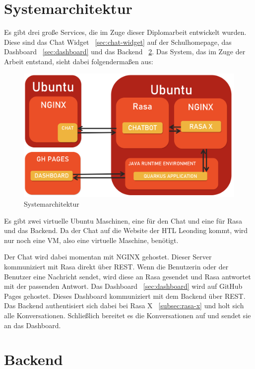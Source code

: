 \section{Systemarchitektur}\label{sec:systemarchitektur}

Es gibt drei große Services, die im Zuge dieser Diplomarbeit entwickelt wurden.
Diese sind das Chat Widget ~\ref{sec:chat-widget} auf der Schulhomepage, das Dashboard ~\ref{sec:dashboard} und das Backend ~\ref{sec:backend}.
Das System, das im Zuge der Arbeit entstand, sieht dabei folgendermaßen aus:

\begin{figure}[hbt!]
    \centering
    \includegraphics[scale=0.3]{pics/systemarchitektur}
    \caption{Systemarchitektur}
    \label{fig:impl:architektur}
\end{figure}

Es gibt zwei virtuelle Ubuntu Maschinen, eine für den Chat und eine für Rasa und das Backend.
Da der Chat auf die Website der HTL Leonding kommt, wird nur noch eine VM, also eine virtuelle Maschine, benötigt.

Der Chat wird dabei momentan mit NGINX gehostet.
Dieser Server kommuniziert mit Rasa direkt über REST.
Wenn die Benutzerin oder der Benutzer eine Nachricht sendet, wird diese an Rasa gesendet und Rasa antwortet mit der passenden Antwort.
Das Dashboard ~\ref{sec:dashboard} wird auf GitHub Pages gehostet.
Dieses Dashboard kommuniziert mit dem Backend über REST.
Das Backend authentisiert sich dabei bei Rasa X ~\ref{subsec:rasa-x} und holt sich alle Konversationen.
Schließlich bereitet es die Konversationen auf und sendet sie an das Dashboard.

\section{Backend}\label{sec:backend}

